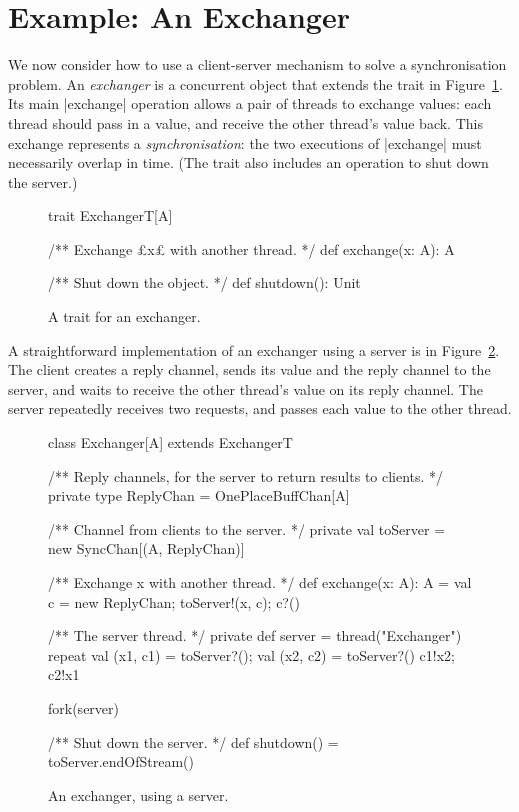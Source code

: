 \section{Example: An Exchanger}
\label{sec:exchanger}

We now consider how to use a client-server mechanism to solve a
synchronisation problem.  
%
An \emph{exchanger} is a concurrent object that extends the
trait in Figure~\ref{fig:ExchangerT}.  Its main |exchange| operation allows a
pair of threads to exchange values: each thread should pass in a value, and
receive the other thread's value back.  This exchange represents a
\emph{synchronisation}: the two executions of
|exchange| must necessarily overlap in time.  (The trait also includes an
operation to shut down the server.)


\begin{figure}
\begin{scala}
trait ExchangerT[A]{
  /** Exchange £x£ with another thread. */
  def exchange(x: A): A

  /** Shut down the object. */
  def shutdown(): Unit
}
\end{scala}
\caption{A trait for an exchanger.}
\label{fig:ExchangerT}
\end{figure}


A straightforward implementation of an exchanger using a server is in
Figure~\ref{fig:exchanger}.  The client creates a reply channel, sends its
value and the reply channel to the server, and waits to receive the other
thread's value on its reply channel.  The server repeatedly receives two
requests, and passes each value to the other thread.


\begin{figure}
\begin{scala}
class Exchanger[A] extends ExchangerT{
  /** Reply channels, for the server to return results to clients. */
  private type ReplyChan = OnePlaceBuffChan[A]

  /** Channel from clients to the server. */
  private val toServer = new SyncChan[(A, ReplyChan)]

  /** Exchange x with another thread. */
  def exchange(x: A): A = {
    val c = new ReplyChan; toServer!(x, c); c?()
  }

  /** The server thread. */
  private def server = thread("Exchanger"){
    repeat{
      val (x1, c1) = toServer?(); val (x2, c2) = toServer?()
      c1!x2; c2!x1
    }
  }

  fork(server)

  /** Shut down the server. */
  def shutdown() = toServer.endOfStream()
}
\end{scala}
\caption{An exchanger, using a server.}
\label{fig:exchanger}
\end{figure}

